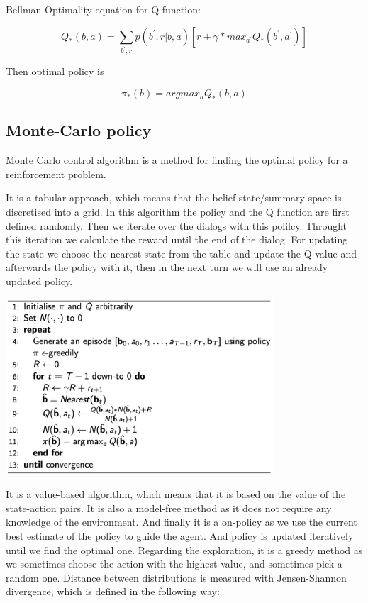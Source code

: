 \documentclass[12pt,titlepage,a4paper]{article}
\begin{document}
Bellman Optimality equation for Q-function:
\begin{center}
    \begin{equation}
        Q_{*}(b, a) = \sum_{b^\prime, r} p(b^\prime, r | b, a)[r + \gamma * max_{a^\prime} Q_{*}(b^\prime, a^\prime)]
    \end{equation}
\end{center} 

Then optimal policy is 
\begin{center}
    \begin{equation}
        \pi_{*}(b) = argmax_{a} Q_{*}(b, a)
    \end{equation}
\end{center} 

\subsection{Monte-Carlo policy}

Monte Carlo control algorithm is a method for finding the optimal policy for a reinforcement problem.

It is a tabular approach, which means that the belief state/summary space is discretised into a grid. In this algorithm the policy and the Q function are first defined randomly. Then we iterate over the dialogs with this polilcy. Throught this iteration we calculate the reward until the end of the dialog. For updating the state we choose the nearest state from the table and update the Q value and afterwards the policy with it, then in the next turn we will use an already updated policy. 

\begin{center}
    \includegraphics[width=10cm]{MCC.png}
\end{center}
It is a value-based algorithm, which means that it is based on the value of the state-action pairs. It is also a model-free method as it does not require any knowledge of the environment. And finally it is a on-policy as we use the current best estimate of the policy to guide the agent. And policy is updated iteratively until we find the optimal one. Regarding the exploration, it is a greedy method as we sometimes choose the action with the highest value, and sometimes pick a random one. Distance between distributions is measured with Jensen-Shannon divergence, which is defined in the following way:
\end{document}
